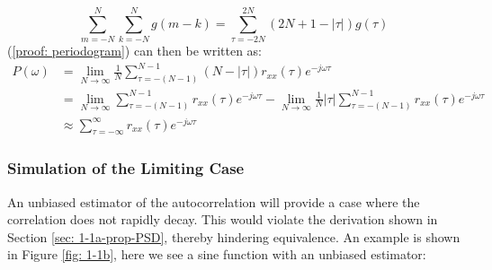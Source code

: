 \documentclass[12pt]{article}
\begin{document}
	\begin{equation}
		\sum_{m=-N}^{N} \sum_{k=-N}^{N} g(m-k) = \sum_{\tau=-2N}^{2N}(2N + 1 - |\tau|)g(\tau)
		\label{proof: periodogram:helper}
	\end{equation}
	\newline
	(\ref{proof: periodogram}) can then be written as:
	\vspace{-\baselineskip}
	\begin{align}
		P(\omega)    & =         \lim_{N\to\infty} \frac{1}{N} \sum_{\tau=-(N-1)}^{N-1}(N - |\tau|)r_{xx}(\tau) e^{-j\omega\tau}\nonumber\\
		& =         \lim_{N\to\infty} \sum_{\tau=-(N-1)}^{N-1} r_{xx}(\tau) e^{-j\omega\tau} -
		\lim_{N\to\infty} \frac{1}{N} |\tau| \sum_{\tau=-(N-1)}^{N-1} r_{xx}(\tau) e^{-j\omega\tau}\nonumber\\
		& \approx   \sum_{\tau=-\infty}^{\infty} r_{xx}(\tau) e^{-j\omega\tau}
		\label{proof: periodogram:shown}
	\end{align}
	
	\subsubsection{Simulation of the Limiting Case} \label{sec: 1-1b-prop-PSD}
	
	An unbiased estimator of the autocorrelation will provide a case where the correlation does not rapidly decay. This would violate the derivation shown in Section \ref{sec: 1-1a-prop-PSD}, thereby hindering equivalence.
	An example is shown in Figure \ref{fig: 1-1b}, here we see a sine function with an unbiased estimator:
	
\end{document}
